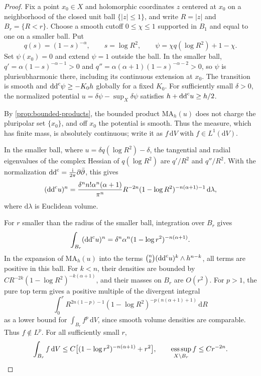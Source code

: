 \begin{proof}
Fix a point $x_0\in X$ and holomorphic coordinates $z$ centered at $x_0$ on a neighborhood of the closed unit ball $\{|z|\leq1\}$, and write $R=|z|$ and $B_r=\{R<r\}$. Choose a smooth cutoff $0\leq\chi\leq1$ supported in $B_1$ and equal to one on a smaller ball. Put
\[
 q(s)=(1-s)^{-\alpha},\qquad s=\log R^2,
 \qquad \psi=\chi q(\log R^2)+1-\chi.
\]
Set $\psi(x_0)=0$ and extend $\psi=1$ outside the ball. In the smaller ball, $q'=\alpha(1-s)^{-\alpha-1}>0$ and $q''=\alpha(\alpha+1)(1-s)^{-\alpha-2}>0$, so $\psi$ is plurisubharmonic there, including its continuous extension at $x_0$. The transition is smooth and $\mathrm{dd}^{\mathrm{c}}\psi\geq-K_0h$ globally for a fixed $K_0$. For sufficiently small $\delta>0$, the normalized potential $u=\delta\psi-\sup_X\delta\psi$ satisfies $h+\mathrm{dd}^{\mathrm{c}} u\geq h/2$.

By \cref{prop:bounded-products}, the bounded product $\mathrm{MA}_h(u)$ does not charge the pluripolar set $\{x_0\}$, and off $x_0$ the potential is smooth. Thus the measure, which has finite mass, is absolutely continuous; write it as $f\,\mathrm dV$ with $f\in L^1(\mathrm dV)$.

In the smaller ball, where $u=\delta q(\log R^2)-\delta$, the tangential and radial eigenvalues of the complex Hessian of $q(\log R^2)$ are $q'/R^2$ and $q''/R^2$. With the normalization $\mathrm{dd}^{\mathrm{c}}=\frac{\mathrm i}{2\pi}\partial\bar\partial$, this gives
\begin{equation}\label{eq:logarithmic-density-radial}
 (\mathrm{dd}^{\mathrm{c}} u)^n
 =\frac{\delta^nn!\alpha^n(\alpha+1)}{\pi^n}
    R^{-2n}(1-\log R^2)^{-n(\alpha+1)-1}\,\mathrm d\lambda,
\end{equation}
where $\mathrm d\lambda$ is Euclidean volume.

For $r$ smaller than the radius of the smaller ball, integration over $B_r$ gives
\[
 \int_{B_r}(\mathrm{dd}^{\mathrm{c}} u)^n
       =\delta^n\alpha^n(1-\log r^2)^{-n(\alpha+1)}.
\]
In the expansion of $\mathrm{MA}_h(u)$ into the terms $\binom nk(\mathrm{dd}^{\mathrm{c}} u)^k\wedge h^{n-k}$, all terms are positive in this ball. For $k<n$, their densities are bounded by
$CR^{-2k}(1-\log R^2)^{-k(\alpha+1)}$, and their masses on $B_r$ are $O(r^2)$. For $p>1$, the pure top term gives a positive multiple of the divergent integral
\[
 \int_0^r R^{2n(1-p)-1}
       (1-\log R^2)^{-p(n(\alpha+1)+1)}\,\mathrm dR
\]
as a lower bound for $\int_{B_r}f^p\,\mathrm dV$, since smooth volume densities are comparable. Thus $f\notin L^p$. For all sufficiently small $r$,
\begin{equation}\label{eq:logarithmic-density-ball}
 \int_{B_r}f\,\mathrm dV
 \leq C\bigl[(1-\log r^2)^{-n(\alpha+1)}+r^2\bigr],
 \qquad \mathop{\rm ess\,sup}_{X\setminus B_r}f\leq Cr^{-2n}.
\end{equation}


\end{proof}
